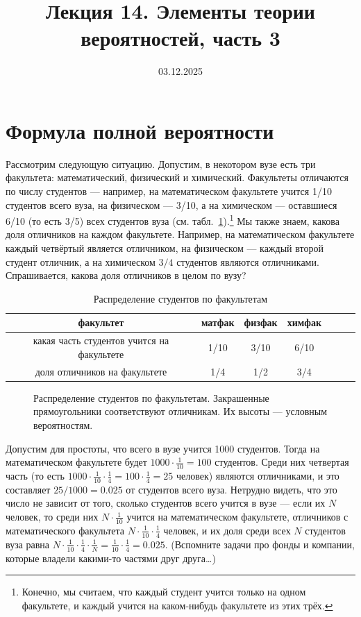 \documentclass[11pt]{article}
\title{Лекция 14. Элементы теории вероятностей, часть 3}
\date{03.12.2025}
\begin{document}
\section{Формула полной вероятности}
Рассмотрим следующую ситуацию. Допустим, в некотором вузе есть три факультета: математический, физический и химический. Факультеты отличаются по числу студентов — например, на математическом факультете учится 1/10 студентов всего вуза, на физическом — 3/10, а на химическом — оставшиеся 6/10 (то есть 3/5) всех студентов вуза (см. табл.~\ref{otlichniki}).\footnote{Конечно, мы считаем, что каждый студент учится только на одном факультете, и каждый учится на каком-нибудь факультете из этих трёх.} Мы также знаем, какова доля отличников на каждом факультете. Например, на математическом факультете каждый четвёртый является отличником, на физическом — каждый второй студент отличник, а на химическом $3/4$ студентов являются отличниками.  Спрашивается, какова доля отличников в целом по вузу?

\begin{table}[hbt]
	\begin{center}
		\begin{tabular}{|c|c|c|c|c|c|c|}
			\hline
			факультет & матфак & физфак & химфак \\
			\hline
			какая часть студентов учится на факультете & 1/10  & 3/10 & 6/10 \\
			\hline
			доля отличников на факультете & 1/4 & 1/2 & 3/4\\
			\hline
		\end{tabular}
		\caption{Распределение студентов по факультетам}\label{otlichniki}
	\end{center}
\end{table}

\begin{figure}[hbt]
	\begin{center}
		\caption{Распределение студентов по факультетам. Закрашенные прямоугольники соответствуют отличникам. Их высоты — условным вероятностям.}\label{fig:fp}
	\end{center}
\end{figure}
Допустим для простоты, что всего в вузе учится 1000 студентов. Тогда на математическом факультете будет $1000\cdot \frac{1}{10}=100$ студентов. Среди них четвертая часть (то есть $1000\cdot \frac{1}{10} \cdot \frac{1}{4}=100\cdot \frac{1}{4}=25$ человек) являются отличниками, и это составляет $25/1000=0.025$ от студентов всего вуза. Нетрудно видеть, что это число не зависит от того, сколько студентов всего учится в вузе — если их $N$ человек, то среди них $N\cdot \frac{1}{10}$ учится на математическом факультете, отличников с математического факультета $N\cdot\frac{1}{10}\cdot\frac {1}{4}$ человек, и их доля среди всех $N$ студентов вуза равна $N\cdot\frac{1}{10}\cdot\frac{1}{4} \cdot \frac{1}{N}=\frac{1}{10}\cdot\frac{1}{4}=0.025$. (Вспомните задачи про фонды и компании, которые владели какими-то частями друг друга…)
\end{document}
